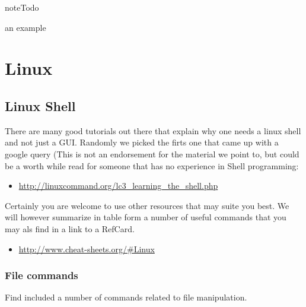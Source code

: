 \begin{sphinxadmonition}{note}{Todo}

an example
\end{sphinxadmonition}


\section{Linux}
\label{\detokenize{lesson/linux/index::doc}}\label{\detokenize{lesson/linux/index:linux}}

\subsection{Linux Shell}
\label{\detokenize{lesson/linux/linux:linux-shell}}\label{\detokenize{lesson/linux/linux::doc}}
There are many good tutorials out there that explain why one needs a
linux shell and not just a GUI. Randomly we picked the firts one that
came up with a google query (This is not an endorsement for the
material we point to, but could be a worth while read for someone that
has no experience in Shell programming:
\begin{itemize}
\item {} 
\url{http://linuxcommand.org/lc3\_learning\_the\_shell.php}

\end{itemize}

Certainly you are welcome to use other resources that may suite you
best. We will however summarize in table form a number of useful
commands that you may als find in a link to a RefCard.
\begin{itemize}
\item {} 
\url{http://www.cheat-sheets.org/\#Linux}

\end{itemize}


\subsubsection{File commands}
\label{\detokenize{lesson/linux/linux:file-commands}}
Find included a number of commands related to file manipulation.

